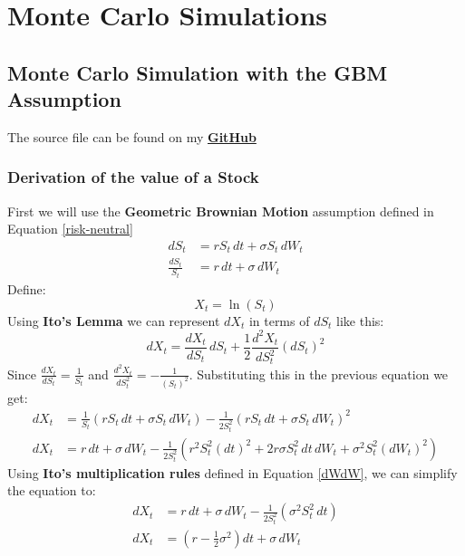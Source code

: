 \documentclass[12pt]{article}
\numberwithin{equation}{section}
\begin{document}
\newpage
\section{Monte Carlo Simulations}
\subsection{Monte Carlo Simulation with the GBM Assumption}
The source file can be found on my \href{https://github.com/neeldevsen/pricingengines/blob/main/I%3A%20European%20Options/02_Monte_Carlo/2.1_monte_carlo_simulation_BS.cpp}{\textbf{GitHub}}
\subsubsection{Derivation of the value of a  Stock}
First we will use the \textbf{Geometric Brownian Motion} assumption defined in Equation \ref{risk-neutral}
\begin{equation*} 
	\begin{aligned}
		dS_t &= rS_t\,dt + \sigma S_t\,dW_t \\
		\frac{dS_t}{S_t} &= r\,dt + \sigma\,dW_t
	\end{aligned}
	\label{eq:gbm-sde}
\end{equation*}
Define: 
\begin{equation}
	X_t = \ln(S_t)
	\label{eq:log-stock-definition}
\end{equation}
Using \textbf{Ito's Lemma} we can represent $dX_t$ in terms of $dS_t$ like this: 
\begin{equation*}
		dX_t = \frac{d X_t}{d S_t}\,dS_t + \frac{1}{2}\frac{d^2 X_t}{d S_t^2}(dS_t)^2 
\end{equation*}
Since $\frac{d X_t}{d S_t} = \frac{1}{S_t}$ and $\frac{d^2 X_t}{d S_t^2} = -\frac{1}{(S_t)^2}$. Substituting this in the previous equation we get:
\begin{equation}
	\begin{aligned}
		dX_t
		&= \frac{1}{S_t}\left(rS_t\,dt+\sigma S_t\,dW_t\right)
		-\frac{1}{2S_t^2}
		\left(rS_t\,dt+\sigma S_t\,dW_t\right)^2 \\
		dX_t &= r\,dt+\sigma\,dW_t
		-\frac{1}{2S_t^2}
		\left(
		r^2S_t^2(dt)^2
		+2r\sigma S_t^2\,dt\,dW_t
		+\sigma^2S_t^2(dW_t)^2
		\right) 
 	\end{aligned}
\end{equation}
Using \textbf{Ito's multiplication rules} defined in Equation \ref{dWdW}, we can simplify the equation to: 
\begin{equation}
	\begin{aligned}
		dX_t &= r\,dt+\sigma\,dW_t
		-\frac{1}{2S_t^2}
		\left(\sigma^2S_t^2\,dt\right) \\
		dX_t &= \left(r-\frac{1}{2}\sigma^2\right)dt+\sigma\,dW_t
	\end{aligned}
	\label{eq:ito-log-stock}
\end{equation}
\end{document}
